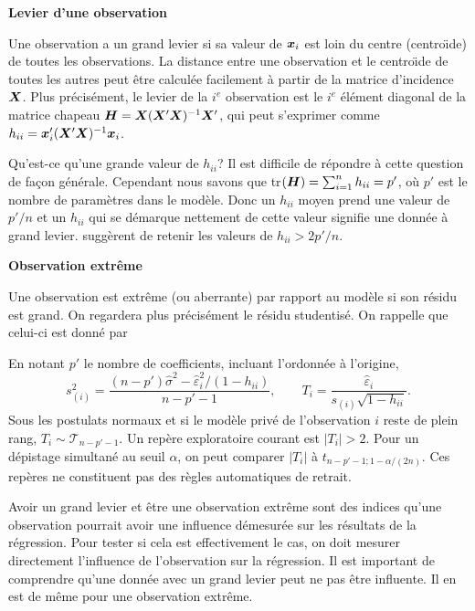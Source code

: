 \textbf{Levier d'une observation}

Une observation a un grand levier si sa valeur de $\bm{x}_i$ est loin du centre (centro\"{\i}de) de toutes les observations. La distance entre une observation et le centro\"{\i}de de toutes les autres peut être calculée facilement à partir de la matrice d'incidence $\bm{X}$. Plus précisément, le levier de la $i^e$ observation est le $i^e$ élément diagonal de la matrice chapeau $\bm{H}=\bm{X}(\bm{X}'\bm{X})^{-1}\bm{X}'$, qui peut s'exprimer comme
$h_{ii}=\bm{x}_i'(\bm{X}'\bm{X})^{-1}\bm{x}_i$.

Qu'est-ce qu'une grande valeur de $h_{ii}$? Il est difficile de
répondre \`a cette question de fa\c{c}on générale. Cependant nous
savons que tr$(\bm{H})=\sum_{i=1}^n h_{ii}=p'$, o\`u $p'$ est le nombre
de paramètres dans le modèle. Donc un $h_{ii}$ moyen prend une valeur de $p'/n$
et un $h_{ii}$ qui se démarque nettement de cette valeur
signifie une donnée \`a grand levier. \citet{Bel_Kuh_Wel:80} suggèrent de retenir les valeurs de $h_{ii}>2p'/n$.

\textbf{Observation extrême}

Une observation est extrême (ou aberrante) par rapport au modèle si son résidu est grand. On regardera plus précisément le résidu studentisé. On rappelle que celui-ci est donné par

En notant $p'$ le nombre de coefficients, incluant l'ordonnée à l'origine,
\[
 s_{(i)}^2=\frac{(n-p')\hat\sigma^2-\hat\varepsilon_i^2/(1-h_{ii})}{n-p'-1},
 \qquad T_i=\frac{\hat\varepsilon_i}{s_{(i)}\sqrt{1-h_{ii}}}.
\]
Sous les postulats normaux et si le modèle privé de l'observation $i$ reste de
plein rang, $T_i\sim\mathcal{T}_{n-p'-1}$. Un repère exploratoire courant est
$|T_i|>2$. Pour un dépistage simultané au seuil $\alpha$, on peut comparer
$|T_i|$ à $t_{n-p'-1;1-\alpha/(2n)}$. Ces repères ne constituent pas des
règles automatiques de retrait.

\begin{remarque}
Avoir un grand levier et être une observation extrême sont des indices qu'une observation pourrait avoir une influence démesurée sur les résultats de la régression. Pour tester si cela est effectivement le cas, on doit mesurer directement l'influence de l'observation sur la régression. Il est important de comprendre qu'une donnée avec un grand levier peut ne pas être influente. Il en est de même pour une observation extrême.
\end{remarque}



